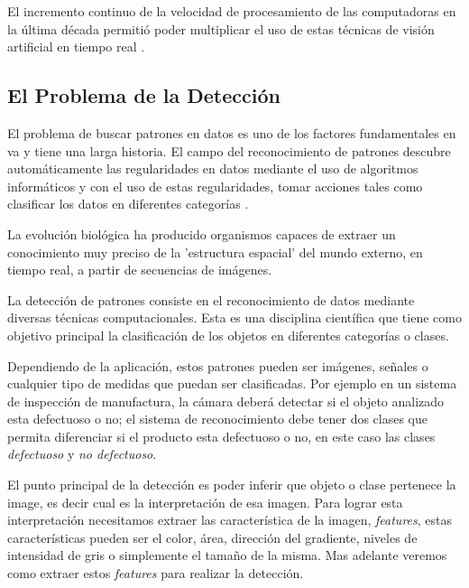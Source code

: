 El incremento continuo de la velocidad de procesamiento de las computadoras en la última década permitió poder multiplicar el uso de estas técnicas de visión artificial en tiempo real \citep{Naill}. 

\subsection{El Problema de la Detección}\label{sub:problemadeteccion}
El problema de buscar patrones en datos es uno de los factores fundamentales en \ac{va} y tiene una larga historia. El campo del reconocimiento de patrones  descubre automáticamente las regularidades en datos mediante el uso de algoritmos informáticos y con el uso de estas regularidades, tomar acciones tales como clasificar los datos en diferentes categorías \citep{bishop}. 
\begin{center}
\begin{minipage}{0.8\linewidth}  \vspace{5pt} {\small
La evolución biológica ha producido organismos capaces de extraer un conocimiento muy preciso de la 'estructura espacial' del mundo externo, en tiempo real, a partir de secuencias de imágenes.}
\begin{flushright}
 \citep{percepcion}
\end{flushright}
\end{minipage}
\end{center}

La detección de patrones consiste en el reconocimiento de datos mediante diversas técnicas computacionales. Esta es una disciplina científica que tiene como objetivo principal la clasificación de los objetos en diferentes categorías o clases.

Dependiendo de la aplicación, estos patrones pueden ser imágenes, señales o cualquier tipo de medidas que puedan ser clasificadas. Por ejemplo en un sistema de inspección de manufactura, la cámara deberá detectar si el objeto analizado esta defectuoso o no; el sistema de reconocimiento debe tener dos clases que permita diferenciar si el producto esta defectuoso o no, en este caso las clases \textit{defectuoso} y \textit{no defectuoso}.

El punto principal de la detección es poder inferir que objeto o clase pertenece la image, es decir cual es la interpretación de esa imagen. Para lograr esta interpretación necesitamos extraer las característica de la imagen, \textit{features}, estas características pueden ser el color, área, dirección del gradiente, niveles de intensidad de gris o simplemente el tamaño de la misma. Mas adelante veremos como extraer estos \textit{features} para realizar la detección.

